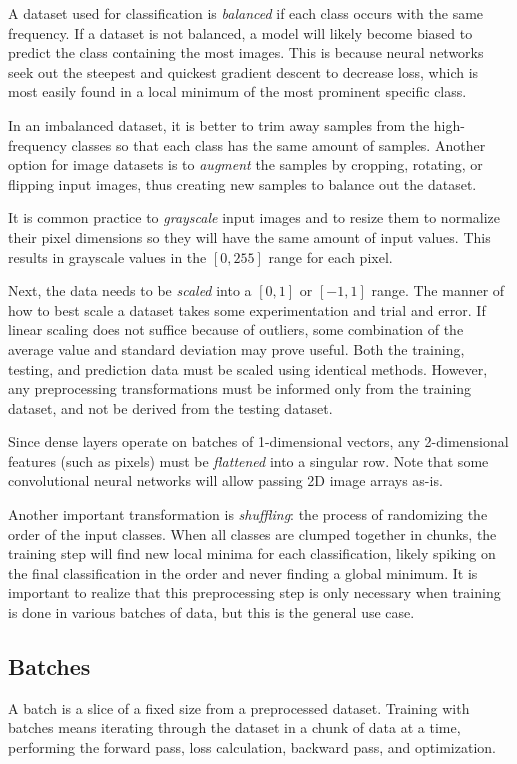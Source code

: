 \documentclass[a4paper]{report}
\begin{document}
A dataset used for classification is \emph{balanced} if each class occurs with the same frequency. If a dataset is not balanced, a model will likely become biased to predict the class containing the most images. This is because neural networks seek out the steepest and quickest gradient descent to decrease loss, which is most easily found in a local minimum of the most prominent specific class. 

In an imbalanced dataset, it is better to trim away samples from the high-frequency classes so that each class has the same amount of samples. Another option for image datasets is to \emph{augment} the samples by cropping, rotating, or flipping input images, thus creating new samples to balance out the dataset. 

It is common practice to \emph{grayscale} input images and to resize them to normalize their pixel dimensions so they will have the same amount of input values. This results in grayscale values in the $[0,255]$ range for each pixel.

Next, the data needs to be \emph{scaled} into a $[0,1]$ or $[-1,1]$ range. The manner of how to best scale a dataset takes some experimentation and trial and error. If linear scaling does not suffice because of outliers, some combination of the average value and standard deviation may prove useful. Both the training, testing, and prediction data must be scaled using identical methods. However, any preprocessing transformations must be informed only from the training dataset, and not be derived from the testing dataset. 

Since dense layers operate on batches of 1-dimensional vectors, any 2-dimensional features (such as pixels) must be \emph{flattened} into a singular row. Note that some convolutional neural networks will allow passing 2D image arrays as-is.

Another important transformation is \emph{shuffling}: the process of randomizing the order of the input classes. When all classes are clumped together in chunks, the training step will find new local minima for each classification, likely spiking on the final classification in the order and never finding a global minimum. It is important to realize that this preprocessing step is only necessary when training is done in various batches of data, but this is the general use case. 

\subsection*{Batches}
A batch is a slice of a fixed size from a preprocessed dataset. Training with batches means iterating through the dataset in a chunk of data at a time, performing the forward pass, loss calculation, backward pass, and optimization. 
\end{document}
